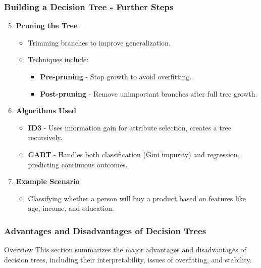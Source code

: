\documentclass[aspectratio=169]{beamer}
\begin{document}
\begin{frame}[fragile]
    \frametitle{Building a Decision Tree - Further Steps}
    \begin{enumerate}
        \setcounter{enumi}{4}
        \item \textbf{Pruning the Tree}
        \begin{itemize}
            \item Trimming branches to improve generalization.
            \item Techniques include:
            \begin{itemize}
                \item \textbf{Pre-pruning} - Stop growth to avoid overfitting.
                \item \textbf{Post-pruning} - Remove unimportant branches after full tree growth.
            \end{itemize}
        \end{itemize}

        \item \textbf{Algorithms Used}
        \begin{itemize}
            \item \textbf{ID3} - Uses information gain for attribute selection, creates a tree recursively.
            \item \textbf{CART} - Handles both classification (Gini impurity) and regression, predicting continuous outcomes.
        \end{itemize}

        \item \textbf{Example Scenario}
        \begin{itemize}
            \item Classifying whether a person will buy a product based on features like age, income, and education.
        \end{itemize}
    \end{enumerate}
\end{frame}

\begin{frame}[fragile]
    \frametitle{Advantages and Disadvantages of Decision Trees}
    \begin{block}{Overview}
        This section summarizes the major advantages and disadvantages of decision trees, including their interpretability, issues of overfitting, and stability.
    \end{block}
\end{frame}
\end{document}
